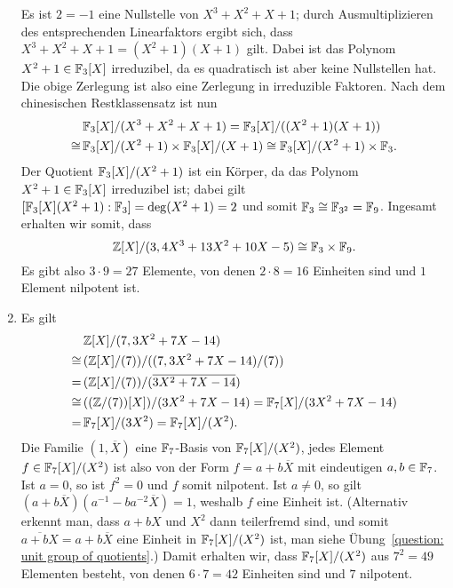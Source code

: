 \begin{solution}
\begin{enumerate}
      Es ist $2 = -1$ eine Nullstelle von $X^3 + X^2 + X + 1$; durch Ausmultiplizieren des entsprechenden Linearfaktors ergibt sich, dass $X^3 + X^2 + X + 1 = (X^2 + 1)(X + 1)$ gilt.
      Dabei ist das Polynom $X^2 + 1 \in \mathbb{F}_3[X]$ irreduzibel, da es quadratisch ist aber keine Nullstellen hat.
      Die obige Zerlegung ist also eine Zerlegung in irreduzible Faktoren.
      Nach dem chinesischen Restklassensatz ist nun
      \begin{align*}
             &\,  \mathbb{F}_3[X]/(X^3 + X^2 + X + 1)
            =     \mathbb{F}_3[X]/( (X^2 + 1)(X + 1) )
        \\
        \cong&\,  \mathbb{F}_3[X]/(X^2 + 1) \times \mathbb{F}_3[X]/(X+1)
        \cong     \mathbb{F}_3[X]/(X^2 + 1) \times \mathbb{F}_3.
      \end{align*}
      Der Quotient $\mathbb{F}_3[X]/(X^2 + 1)$ ist ein Körper, da das Polynom $X^2 + 1 \in \mathbb{F}_3[X]$ irreduzibel ist; dabei gilt $[\mathbb{F}_3[X](X^2 + 1) : \mathbb{F}_3] = \deg (X^2 + 1) = 2$ und somit $\mathbb{F}_3 \cong \mathbb{F}_{3^2} = \mathbb{F}_9$.
      Ingesamt erhalten wir somit, dass
      \[
              \mathbb{Z}[X]/(3, 4 X^3 + 13 X^2 + 10 X - 5)
        \cong \mathbb{F}_3 \times \mathbb{F}_9.
      \]
      Es gibt also $3 \cdot 9 = 27$ Elemente, von denen $2 \cdot 8 = 16$ Einheiten sind und $1$ Element nilpotent ist.
    
    \item
      Es gilt
      \begin{align*}
             &\,  \mathbb{Z}[X]/(7, 3 X^2 + 7X - 14)
        \\
        \cong&\,  ( \mathbb{Z}[X]/(7) ) / ( (7, 3 X^2 + 7X - 14 ) / (7) )
        \\
            =&\,  ( \mathbb{Z}[X]/(7) ) / ( \overline{3 X^2 + 7X - 14} )
        \\
        \cong&\,  ( (\mathbb{Z}/(7))[X] ) / (3 X^2 + 7X - 14)
            =     \mathbb{F}_7[X] / (3 X^2 + 7 X - 14)
        \\
            =&\,   \mathbb{F}_7[X] / (3 X^2)
            =     \mathbb{F}_7[X] / (X^2).
      \end{align*}
      Die Familie $(1, \overline{X})$ eine $\mathbb{F}_7$-Basis von $\mathbb{F}_7[X]/(X^2)$, jedes Element $f \in \mathbb{F}_7[X]/(X^2)$ ist also von der Form $f = a + b \overline{X}$ mit eindeutigen $a, b \in \mathbb{F}_7$.
      Ist $a = 0$, so ist $f^2 = 0$ und $f$ somit nilpotent.
      Ist $a \neq 0$, so gilt $(a + b\overline{X}) (a^{-1} - b a^{-2} \overline{X}) = 1$, weshalb $f$ eine Einheit ist.
      (Alternativ erkennt man, dass $a + b X$ und $X^2$ dann teilerfremd sind, und somit $\overline{a + b X} = a + b \overline{X}$ eine Einheit in $\mathbb{F}_7[X]/(X^2)$ ist, man siehe Übung~\ref{question: unit group of quotients}.)
      Damit erhalten wir, dass $\mathbb{F}_7[X]/(X^2)$ aus $7^2 = 49$ Elementen besteht, von denen $6 \cdot 7 = 42$ Einheiten sind und $7$ nilpotent.
  \end{enumerate}
\end{solution}



